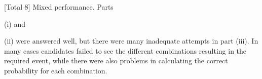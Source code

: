 [Total 8]
Mixed performance. Parts \item (i) and \item (ii) were answered well, but there were many inadequate
attempts in part (iii). In many cases candidates failed to see the different combinations
resulting in the required event, while there were also problems in calculating the correct
probability for each combination.
